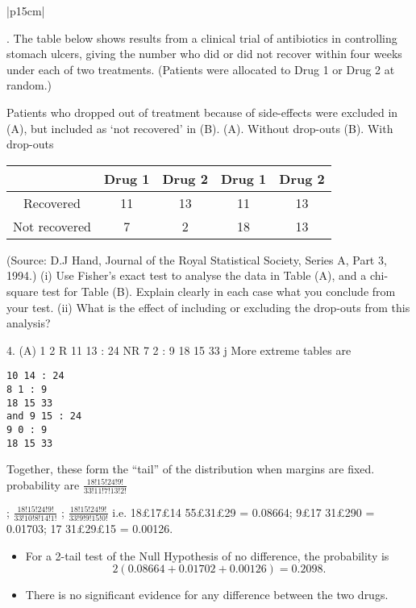\documentclass[a4paper,12pt]{article}
\begin{document}
\begin{table}[ht!]
     
\centering
     
\begin{tabular}{|p{15cm}|}
     
. The table below shows results from a clinical trial of antibiotics in controlling stomach
ulcers, giving the number who did or did not recover within four weeks under each of two
treatments. (Patients were allocated to Drug 1 or Drug 2 at random.)

Patients who dropped out of treatment because of side-effects were excluded in (A), but included as ‘not
recovered’ in (B).
(A). Without drop-outs (B). With drop-outs

\begin{center}
\begin{tabular}{|c|c|c|c|c|}  \hline 
& Drug 1& Drug 2 &  Drug 1&  Drug 2\\ \hline 
Recovered&  11&  13&  11&  13\\  \hline 
Not recovered &  7 & 2 & 18&  13\\  \hline 
\end{tabular}
\end{center}


(Source: D.J Hand, Journal of the Royal Statistical Society, Series A, Part 3, 1994.)
(i) Use Fisher’s exact test to analyse the data in Table (A), and a chi-square test for
Table (B). Explain clearly in each case what you conclude from your test.
(ii) What is the effect of including or excluding the drop-outs from this analysis?
\\ \hline
      
\end{tabular}
    
\end{table}
4. (A)
1 2
R 11 13 : 24
NR 7 2 : 9
18 15 33
j
More extreme tables are
\begin{verbatim}
10 14 : 24
8 1 : 9
18 15 33
and 9 15 : 24
9 0 : 9
18 15 33
\end{verbatim}
Together, these form the “tail” of the distribution when margins are fixed.
probability are
$ \frac{18! 15! 24! 9!}{33! 11! 7! 13! 2!}$

;
$ \frac{18! 15! 24! 9!}{33! 10! 8! 14! 1!}$
;
$ \frac{18! 15! 24! 9!}{33! 9! 9! 15! 0!}$
i.e. 18£17£14
55£31£29 = 0.08664; 9£17
31£290 = 0.01703; 17
31£29£15 = 0.00126.
\begin{itemize}
    \item For a 2-tail test of the Null Hypothesis of no difference, the probability is
\[2(0.08664+0.01702+0.00126) = 0.2098. \]
\item There is no significant evidence for
any difference between the two drugs.

\end{itemize}
\end{document}
